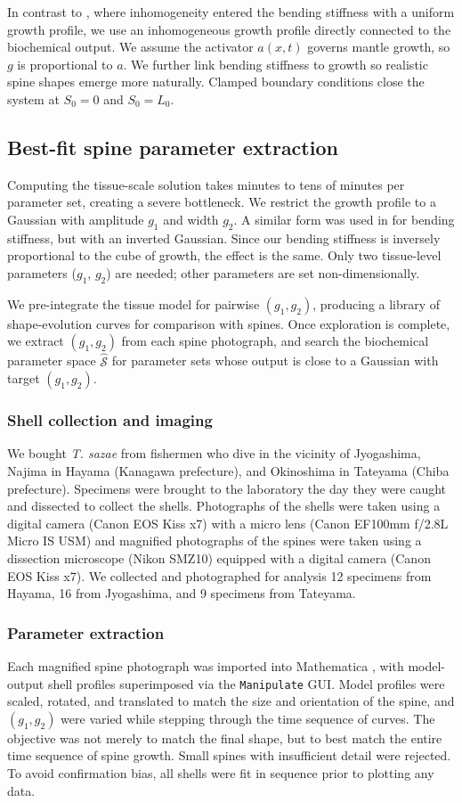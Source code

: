 \documentclass[11pt]{article}
\begin{document}
In contrast to \citep{ref19}, where inhomogeneity entered the bending stiffness with a uniform growth profile, we use an inhomogeneous growth profile directly connected to the biochemical output. We assume the activator $a(x,t)$ governs mantle growth, so $g$ is proportional to $a$. We further link bending stiffness to growth so realistic spine shapes emerge more naturally. Clamped boundary conditions close the system at $S_0=0$ and $S_0=L_0$.

\subsection{Best-fit spine parameter extraction}
Computing the tissue-scale solution takes minutes to tens of minutes per parameter set, creating a severe bottleneck. We restrict the growth profile to a Gaussian with amplitude $g_1$ and width $g_2$. A similar form was used in \citep{ref19} for bending stiffness, but with an inverted Gaussian. Since our bending stiffness is inversely proportional to the cube of growth, the effect is the same. Only two tissue-level parameters ($g_1$, $g_2$) are needed; other parameters are set non-dimensionally.

We pre-integrate the tissue model for pairwise $(g_1,g_2)$, producing a library of shape-evolution curves for comparison with spines. Once exploration is complete, we extract $(g_1,g_2)$ from each spine photograph, and search the biochemical parameter space $\hat{\mathcal{S}}$ for parameter sets whose output is close to a Gaussian with target $(g_1,g_2)$.

\subsubsection{Shell collection and imaging}
We bought \textit{T. sazae} from fishermen who dive in the vicinity of Jyogashima, Najima in Hayama (Kanagawa prefecture), and Okinoshima in Tateyama (Chiba prefecture). Specimens were brought to the laboratory the day they were caught and dissected to collect the shells. Photographs of the shells were taken using a digital camera (Canon EOS Kiss x7) with a micro lens (Canon EF100mm f/2.8L Micro IS USM) and magnified photographs of the spines were taken using a dissection microscope (Nikon SMZ10) equipped with a digital camera (Canon EOS Kiss x7). We collected and photographed for analysis 12 specimens from Hayama, 16 from Jyogashima, and 9 specimens from Tateyama.

\subsubsection{Parameter extraction}
Each magnified spine photograph was imported into Mathematica \citep{ref39}, with model-output shell profiles superimposed via the \texttt{Manipulate} GUI. Model profiles were scaled, rotated, and translated to match the size and orientation of the spine, and $(g_1,g_2)$ were varied while stepping through the time sequence of curves. The objective was not merely to match the final shape, but to best match the entire time sequence of spine growth. Small spines with insufficient detail were rejected. To avoid confirmation bias, all shells were fit in sequence prior to plotting any data.
\end{document}
